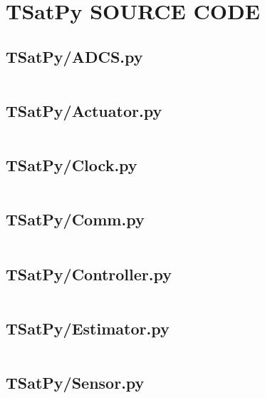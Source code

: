 
\chapter{TSatPy SOURCE CODE}
\label{chap:tsatpy_source}

\linespread{1}

\pagebreak
\section*{TSatPy/ADCS.py}\label{code:TSatPy/ADCS.py}\inputminted[linenos,fontsize=\scriptsize]{python}{/home/dcouture/git/mathyourlife/TSatPy/TSatPy/ADCS.py}

\pagebreak
\section*{TSatPy/Actuator.py}\label{code:TSatPy/Actuator.py}\inputminted[linenos,fontsize=\scriptsize]{python}{/home/dcouture/git/mathyourlife/TSatPy/TSatPy/Actuator.py}

\pagebreak
\section*{TSatPy/Clock.py}\label{code:TSatPy/Clock.py}\inputminted[linenos,fontsize=\scriptsize]{python}{/home/dcouture/git/mathyourlife/TSatPy/TSatPy/Clock.py}

\pagebreak
\section*{TSatPy/Comm.py}\label{code:TSatPy/Comm.py}\inputminted[linenos,fontsize=\scriptsize]{python}{/home/dcouture/git/mathyourlife/TSatPy/TSatPy/Comm.py}

\pagebreak
\section*{TSatPy/Controller.py}\label{code:TSatPy/Controller.py}\inputminted[linenos,fontsize=\scriptsize]{python}{/home/dcouture/git/mathyourlife/TSatPy/TSatPy/Controller.py}

\pagebreak
\section*{TSatPy/Estimator.py}\label{code:TSatPy/Estimator.py}\inputminted[linenos,fontsize=\scriptsize]{python}{/home/dcouture/git/mathyourlife/TSatPy/TSatPy/Estimator.py}

\pagebreak
\section*{TSatPy/Sensor.py}\label{code:TSatPy/Sensor.py}\inputminted[linenos,fontsize=\scriptsize]{python}{/home/dcouture/git/mathyourlife/TSatPy/TSatPy/Sensor.py}

